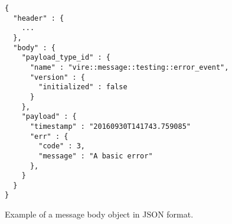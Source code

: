 \begin{figure}[h]
\vskip 10pt
\small
\begin{Verbatim}[frame=single,xleftmargin=0.cm,label=\fbox{JSON}]
{
  "header" : {
    ...
  },
  "body" : {
    "payload_type_id" : {
      "name" : "vire::message::testing::error_event",
      "version" : {
        "initialized" : false
      }
    },
    "payload" : {
      "timestamp" : "20160930T141743.759085"
      "err" : {
        "code" : 3,
        "message" : "A basic error"
      },
    }
  }
}
\end{Verbatim}
\normalsize
\caption{Example of  a   message  body  object in JSON format.}
\label{fig-vire-message-message_body-json}
\end{figure}

\vfill
\clearpage
\pagebreak

